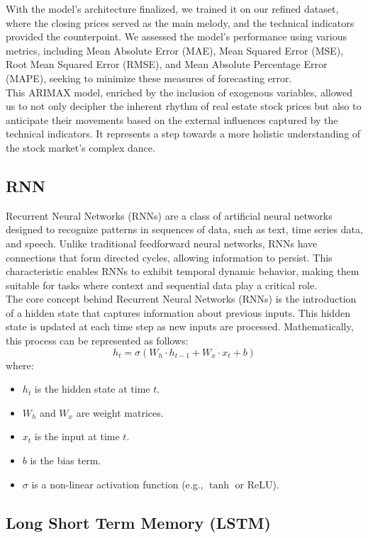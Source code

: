 \documentclass{ieeeojies}
\begin{document}
With the model's architecture finalized, we trained it on our refined dataset, where the closing prices served as the main melody, and the technical indicators provided the counterpoint. We assessed the model's performance using various metrics, including Mean Absolute Error (MAE), Mean Squared Error (MSE), Root Mean Squared Error (RMSE), and Mean Absolute Percentage Error (MAPE), seeking to minimize these measures of forecasting error.\\

This ARIMAX model, enriched by the inclusion of exogenous variables, allowed us to not only decipher the inherent rhythm of real estate stock prices but also to anticipate their movements based on the external influences captured by the technical indicators. It represents a step towards a more holistic understanding of the stock market's complex dance.


  \subsection{RNN}
  Recurrent Neural Networks (RNNs) are a class of artificial neural networks designed to recognize patterns in sequences of data, such as text, time series data, and speech. Unlike traditional feedforward neural networks, RNNs have connections that form directed cycles, allowing information to persist. This characteristic enables RNNs to exhibit temporal dynamic behavior, making them suitable for tasks where context and sequential data play a critical role.
  \\ The core concept behind Recurrent Neural Networks (RNNs) is the introduction of a hidden state that captures information about previous inputs. This hidden state is updated at each time step as new inputs are processed. Mathematically, this process can be represented as follows:
  \[
  h_t = \sigma(W_h \cdot h_{t-1} + W_x \cdot x_t + b)
  \]
  where:
  \begin{itemize}
      \item $h_t$ is the hidden state at time $t$.
      \item $W_h$ and $W_x$ are weight matrices.
      \item $x_t$ is the input at time $t$.
      \item $b$ is the bias term.
      \item $\sigma$ is a non-linear activation function (e.g., $\tanh$ or $\text{ReLU}$).
  \end{itemize}  
  \subsection{Long Short Term Memory (LSTM)}
\end{document}
